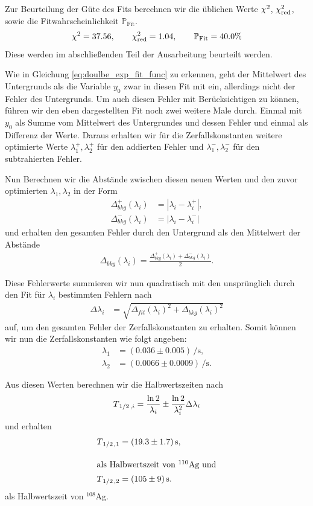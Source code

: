 Zur Beurteilung der Güte des Fits berechnen wir die üblichen Werte $\chi^{2}$, $\chi^{2}_{\mathrm{red}}$, sowie die Fitwahrscheinlichkeit $\mathbb{P}_{\mathrm{Fit}}$.
\begin{align}
    \chi^{2} = 37.56, \qquad \chi^{2}_{\mathrm{red}} = 1.04, \qquad \mathbb{P}_{\mathrm{Fit}} = 40.0\%
\end{align}
Diese werden im abschließenden Teil der Ausarbeitung beurteilt werden.

Wie in Gleichung \ref{eq:doulbe_exp_fit_func} zu erkennen, geht der Mittelwert des Untergrunds als die Variable $y_0$ zwar in diesen Fit mit ein, allerdings nicht der Fehler des Untergrunds. Um auch diesen Fehler mit Berücksichtigen zu können, führen wir den eben dargestellten Fit noch zwei weitere Male durch. Einmal mit $y_0$ als Summe vom Mittelwert des Untergrundes und dessen Fehler und einmal als Differenz der Werte. Daraus erhalten wir für die Zerfallskonstanten weitere optimierte Werte $\lambda_1^+, \lambda_2^+$ für den addierten Fehler und $\lambda_1^-, \lambda_2^-$ für den subtrahierten Fehler. 

Nun Berechnen wir die Abstände zwischen diesen neuen Werten und den zuvor optimierten $\lambda_1, \lambda_2$ in der Form
\begin{align}
    \Delta^+_{bkg}(\lambda_i) &= |\lambda_i - \lambda_i^+|,\\
    \Delta^-_{bkg}(\lambda_i) &= |\lambda_i - \lambda_i^-|
\end{align}
und erhalten den gesamten Fehler durch den Untergrund als den Mittelwert der Abstände
\begin{align}
    \Delta_{bkg}(\lambda_i) = \frac{\Delta^+_{bkg}(\lambda_i) + \Delta^-_{bkg}(\lambda_i)}{2}.
\end{align}

Diese Fehlerwerte summieren wir nun quadratisch mit den unsprünglich durch den Fit für $\lambda_i$ bestimmten Fehlern nach
\begin{align}
    \Delta \lambda_i &= \sqrt{\Delta_{fit}(\lambda_i)^2 + \Delta_{bkg}(\lambda_i)^2}
\end{align}
auf, um den gesamten Fehler der Zerfallskonstanten zu erhalten. Somit können wir nun die Zerfallskonstanten wie folgt angeben:
\begin{align}
    \lambda_1 &= (0.036 \pm 0.005)\, \si{\per\second},\\[1em]
    \lambda_2 &= (0.0066 \pm 0.0009)\, \si{\per\second}.
\end{align}

Aus diesen Werten berechnen wir die Halbwertszeiten nach
\begin{align}
    T_{\flatfrac{1}{2}, i} = \frac{\ln{2}}{\lambda_i} \pm \frac{\ln{2}}{\lambda_i^2} \Delta \lambda_i
\end{align}
und erhalten
\begin{align}
    T_{\flatfrac{1}{2}, 1} &= (19.3 \pm 1.7)\, \si{\second},\\[1em]
    \intertext{als Halbwertszeit von $^{110}$Ag und}
    T_{\flatfrac{1}{2}, 2} &= (105 \pm 9)\, \si{\second}.
\end{align}
als Halbwertszeit von $^{108}$Ag.

